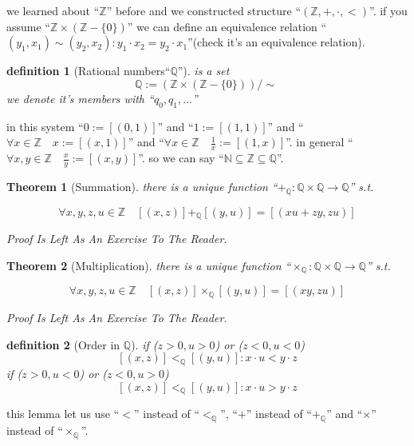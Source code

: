 \documentclass[10pt,a4paper]{book}
\newtheorem{definition}{definition}[section]
\newtheorem{theorem}{Theorem}[section]
\begin{document}
we learned about ``$\mathbb{Z}$'' before and we constructed structure
``$(\mathbb{Z} , + , \cdot , <)$''. if you assume ``$\mathbb{Z} \times
    (\mathbb{Z} - \{0\})$'' we can define an equivalence relation ``$ (y_1 , x_1 )
    \sim (y_2 , x_2 ) : y_1 \cdot x_2 = y_2 \cdot x_1 $''(check it's an equivalence
relation).

\begin{definition}[Rational numbers``$\mathbb{Q}$''] is a set
    \[ \mathbb{Q} := (\mathbb{Z} \times (\mathbb{Z} - \{0\})) / \sim \ \]
    we denote it's members with ``$q_0 , q_1 ,...$''
\end{definition}

in this system ``$ 0 := [(0,1)]$'' and ``$ 1 := [(1,1)]$'' and ``$ \forall x
    \in \mathbb{Z} \quad x := [(x,1)]$'' and ``$\forall x \in \mathbb{Z} \quad
    \frac{1}{x} := [(1,x)]$''. in general ``$\forall x,y \in \mathbb{Z} \quad
    \frac{x}{y} := [(x,y)]$''. so we can say ``$ \mathbb{N} \subseteq \mathbb{Z}
    \subseteq \mathbb{Q} $''.

\begin{theorem}[Summation] there is a unique function ``$+_\mathbb{Q} :\mathbb{Q} \times \mathbb{Q} \to \mathbb{Q}$'' s.t.

    \[ \forall x  , y  , z , u  \in \mathbb{Z} \quad [(x  , z)] +_\mathbb{Q} [(y  , u)]  = [(x u  + z y ,  z  u)] \]

    Proof Is Left As An Exercise To The Reader.
\end{theorem}

\begin{theorem}[Multiplication] there is a unique function ``$\times_\mathbb{Q} :\mathbb{Q} \times \mathbb{Q} \to \mathbb{Q}$'' s.t.

    \[ \forall x  , y  , z , u  \in \mathbb{Z} \quad [(x  , z)] \times_\mathbb{Q} [(y  , u)]  = [(x  y , z u)] \]

    Proof Is Left As An Exercise To The Reader.
\end{theorem}

\begin{definition}[Order in $\mathbb{Q}$]
    if ($z > 0 , u > 0$) or ($z < 0 , u < 0$)
    \[ [(x  , z)] <_\mathbb{Q} [(y  , u)]  : x  \cdot u  < y  \cdot z \]
    if ($z > 0 , u < 0$) or ($z < 0 , u > 0$)
    \[ [(x  , z)] <_\mathbb{Q} [(y  , u)]  : x  \cdot u  > y  \cdot z \]
\end{definition}

this lemma let us use ``$<$'' instead of ``$<_\mathbb{Q}$'', ``$+$'' instead of
``$+_\mathbb{Q}$'' and ``$\times$'' instead of ``$\times_\mathbb{Q}$''.
\end{document}
